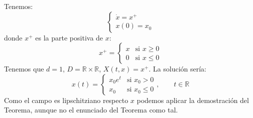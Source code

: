 \begin{ejemplo}
    Tenemos:
    \begin{equation*}
        \left\{\begin{array}{l}
                \dot{x} = x^+ \\
                x(0) = x_0
        \end{array}\right.
    \end{equation*}
    donde $x^+$ es la parte positiva de $x$:
    \begin{equation*}
        x^+ = \left\{\begin{array}{ll}
            x & \text{si\ } x\geq 0 \\
             0 & \text{si\ } x\leq 0
        \end{array}\right. 
    \end{equation*}
    Tenemos que $d=1$, $D= \mathbb{R}\times \mathbb{R}$, $X(t,x) = x^+$. La solución sería:
    \begin{equation*}
        x(t) = \left\{\begin{array}{ll}
            x_0e^t & \text{si\ } x_0>0 \\
             x_0 & \text{si\ } x_0 \leq 0
        \end{array}\right. , \qquad t\in \mathbb{R}
    \end{equation*}
    Como el campo es lipschitziano respecto $x$ podemos aplicar la demostración del Teorema, aunque no el enunciado del Teorema como tal.
\end{ejemplo}


